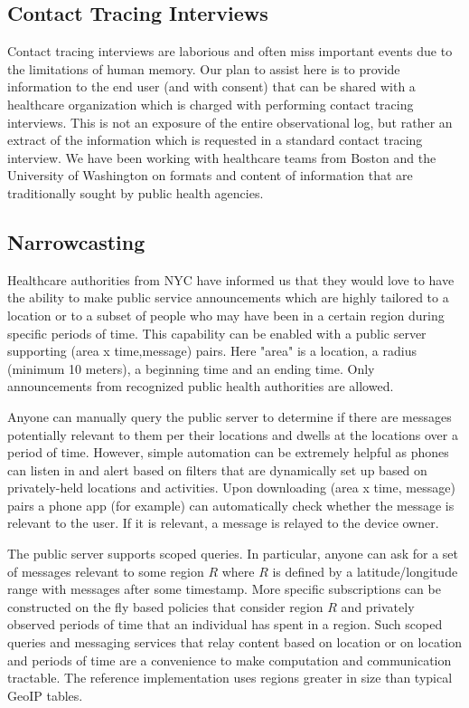 \documentclass{article}
\begin{document}
\subsection{Contact Tracing Interviews} 
Contact tracing interviews are laborious and often miss important events due to the limitations of human memory.  Our plan to assist here is to provide information to the end user (and with consent) that can be shared with a healthcare organization which is charged with performing contact tracing interviews.   This is not an exposure of the entire observational log, but rather an extract of the information which is requested in a standard contact tracing interview. We have been working with healthcare teams from Boston and the University of Washington on formats and content of information that are traditionally sought by public health agencies.

\subsection{Narrowcasting}

Healthcare authorities from NYC have informed us that they would love to have the ability to make public service announcements which are highly tailored to a location or to a subset of people who may have been in a certain region during specific periods of time.  This capability can be enabled with a public server supporting (area x time,message) pairs.  Here "area" is a location, a radius (minimum 10 meters), a beginning time and an ending time.  Only announcements from recognized public health authorities are allowed.  

Anyone can manually query the public server to determine if there are messages potentially relevant to them per their locations and dwells at the locations over a period of time. However, simple automation can be extremely helpful as phones can listen in and alert based on filters that are dynamically set up based on privately-held locations and activities. Upon downloading (area x time, message) pairs a phone app (for example) can automatically check whether the message is relevant to the user.  If it is relevant, a message is relayed to the device owner.

The public server supports scoped queries.  In particular, anyone can ask for a set of messages relevant to some region $R$ where $R$ is defined by a latitude/longitude range with messages after some timestamp.  More specific subscriptions can be constructed on the fly based policies that consider region $R$ and privately observed periods of time that an individual has spent in a region. Such scoped queries and messaging services that relay content based on location or on location and periods of time are a convenience to make computation and communication tractable.  The reference implementation uses regions greater in size than typical GeoIP tables.
\end{document}
